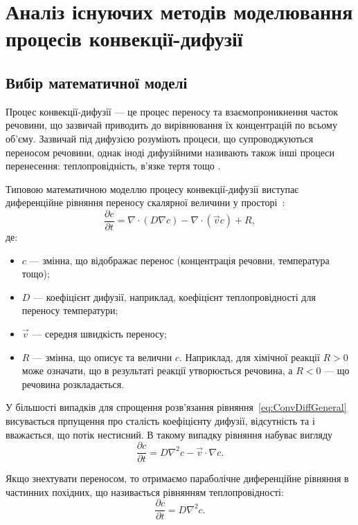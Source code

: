 \documentclass{diploma}
\begin{document}
\chapter{Аналіз існуючих методів моделювання процесів конвекції-дифузії}
\section{Вибір математичної моделі}
Процес конвекції-дифузії --- це процес переносу та взаємопроникнення часток речовини, що зазвичай приводить до вирівнювання їх концентрацій по всьому об'єму. Зазвичай під дифузією розуміють процеси, що супроводжуються переносом речовини, однак іноді дифузійними називають також інші процеси перенесення: теплопровідність, в'язке тертя тощо \cite{Landafshitz}.

Типовою математичною моделлю процесу конвекції-дифузії виступає диференційне рівняння переносу скалярної величини у просторі~\cite{Sokolofsky}:
\begin{equation} \label{eq:ConvDiffGeneral}
	\frac{\partial c}{\partial t} = \nabla \cdot (D \nabla c) - \nabla \cdot (\vec{v} c) + R,
\end{equation}
де:
\begin{itemize}
	\item $c$ --- змінна, що відображає перенос (концентрація речовни, температура тощо);
	\item $D$ --- коефіцієнт дифузії, наприклад, коефіцієнт теплопровідності для переносу температури;
	\item $\vec{v}$ --- середня швидкість переносу;
	\item $R$ --- змінна, що описує  та  велични $c$. Наприклад, для хімічної реакції $R>0$ може означати, що в результаті реакції утворюється речовина, а $R<0$ --- що речовина розкладається.
\end{itemize}

У більшості випадків для спрощення розв'язання рівняння~\ref{eq:ConvDiffGeneral} висувається прпущення про сталість коефіцієнту дифузії, відсутність  та  і вважається, що потік нестисний. В такому випадку рівняння набуває вигляду~\cite{Bejan}
\begin{equation} \label{eq:ConvDiffSimple}
	\frac{\partial c}{\partial t} = D \nabla^2 c - \vec{v} \cdot \nabla c.
\end{equation}

Якщо знехтувати переносом, то отримаємо параболічне диференційне рівняння в частинних похідних, що називається рівнянням теплопровідності:
\begin{equation} \label{eq:Heat}
	\frac{\partial c}{\partial t} = D \nabla^2 c.
\end{equation}
\end{document}
